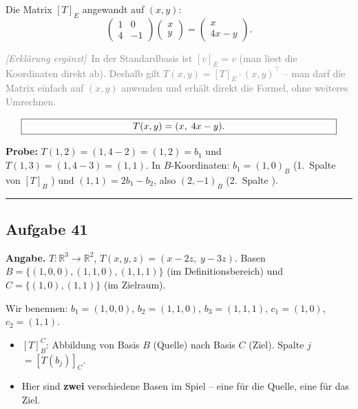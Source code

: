 \documentclass[a4paper,12pt]{article}
\newcommand{\erglerk}{\textcolor{gray}{\small\textit{[Erkl\"arung erg\"anzt]}}}
\begin{document}
Die Matrix $[T]_E$ angewandt auf $(x, y)$:
\[
\begin{pmatrix} 1 & 0 \\ 4 & -1 \end{pmatrix}\begin{pmatrix} x \\ y \end{pmatrix}
= \begin{pmatrix} x \\ 4x - y \end{pmatrix}.
\]

\erglerk\ \textcolor{gray}{\small In der Standardbasis ist $[v]_E = v$ (man liest die Koordinaten direkt ab). Deshalb gilt $T(x,y) = [T]_E \cdot (x,y)^\top$ -- man darf die Matrix einfach auf $(x,y)$ anwenden und erh\"alt direkt die Formel, ohne weiteres Umrechnen.}

\[
\fbox{\parbox{0.93\textwidth}{\centering
$T(x, y) = (x,\; 4x - y)$.
}}
\]

\textbf{Probe:} $T(1,2) = (1, 4-2) = (1, 2) = b_1$ und $T(1,3) = (1, 4-3) = (1,1)$.
In $B$-Koordinaten: $b_1 = (1,0)_B$ (1.\ Spalte von $[T]_B$ \checkmark) und $(1,1) = 2 b_1 - b_2$, also $(2,-1)_B$ (2.\ Spalte \checkmark).

\bigskip
\hrule
\bigskip

\subsection*{Aufgabe 41}

\textbf{Angabe.} $T \colon \mathbb{R}^3 \to \mathbb{R}^2$, $T(x, y, z) = (x - 2z,\; y - 3z)$.
Basen $B = \{(1,0,0),(1,1,0),(1,1,1)\}$ (im Definitionsbereich) und $C = \{(1,0),(1,1)\}$ (im Zielraum).

Wir benennen: $b_1 = (1,0,0)$, $b_2 = (1,1,0)$, $b_3 = (1,1,1)$, \; $c_1 = (1,0)$, $c_2 = (1,1)$.

\begin{begriffe}
\begin{itemize}[leftmargin=*, nosep]
    \item $[T]_B^C$: Abbildung von Basis $B$ (Quelle) nach Basis $C$ (Ziel). Spalte $j$ $= [T(b_j)]_C$.
    \item Hier sind \textbf{zwei} verschiedene Basen im Spiel -- eine f\"ur die Quelle, eine f\"ur das Ziel.
\end{itemize}
\end{begriffe}
\end{document}
